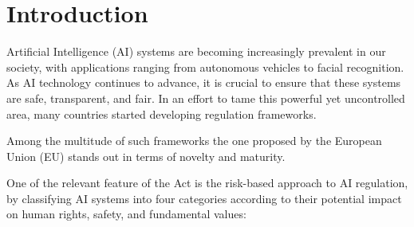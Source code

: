 \section{Introduction}

Artificial Intelligence (AI) systems are becoming increasingly prevalent in our society, with applications ranging from autonomous vehicles to facial recognition. 
As AI technology continues to advance, it is crucial to ensure that these systems are safe, transparent, and fair.
In an effort to tame this powerful yet uncontrolled area, many countries started developing regulation frameworks.

Among the multitude of such frameworks the one proposed by the European Union (EU) stands out in terms of novelty and maturity.

One of the relevant feature of the Act is the risk-based approach to AI regulation, by classifying AI systems into four categories according to their potential impact on human rights, safety, and fundamental values:

